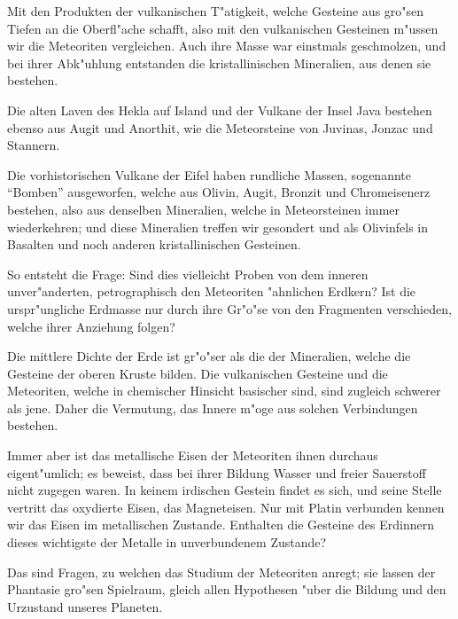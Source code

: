 \documentclass[a4paper, 11pt, oneside, german]{article}
\begin{document}
Mit den Produkten der vulkanischen T"atigkeit, welche Gesteine aus gro"sen Tiefen an die Oberfl"ache schafft, also mit den vulkanischen Gesteinen m"ussen wir die Meteoriten vergleichen. Auch ihre Masse war einstmals geschmolzen, und bei ihrer Abk"uhlung entstanden die kristallinischen Mineralien, aus denen sie bestehen.

Die alten Laven des Hekla auf Island und der Vulkane der Insel Java bestehen ebenso aus Augit und Anorthit, wie die Meteorsteine von Juvinas, Jonzac und Stannern.

Die vorhistorischen Vulkane der Eifel haben rundliche Massen, sogenannte "`Bomben"' ausgeworfen, welche aus Olivin, Augit, Bronzit und Chromeisenerz bestehen, also aus denselben Mineralien, welche in Meteorsteinen immer wiederkehren; und diese Mineralien treffen wir gesondert und als Olivinfels in Basalten und noch anderen kristallinischen Gesteinen.

So entsteht die Frage: Sind dies vielleicht Proben von dem inneren unver"anderten, petrographisch den Meteoriten "ahnlichen Erdkern? Ist die urspr"ungliche Erdmasse nur durch ihre Gr"o"se von den Fragmenten verschieden, welche ihrer Anziehung folgen?

Die mittlere Dichte der Erde ist gr"o"ser als die der Mineralien, welche die Gesteine der oberen Kruste bilden. Die vulkanischen Gesteine und die Meteoriten, welche in chemischer Hinsicht basischer sind, sind zugleich schwerer als jene. Daher die Vermutung, das Innere m"oge aus solchen Verbindungen bestehen.

Immer aber ist das metallische Eisen der Meteoriten ihnen durchaus eigent"umlich; es beweist, dass bei ihrer Bildung Wasser und freier Sauerstoff nicht zugegen waren. In keinem irdischen Gestein findet es sich, und seine Stelle vertritt das oxydierte Eisen, das Magneteisen. Nur mit Platin verbunden kennen wir das Eisen im metallischen Zustande. Enthalten die Gesteine des Erdinnern dieses wichtigste der Metalle in unverbundenem Zustande?

Das sind Fragen, zu welchen das Studium der Meteoriten anregt; sie lassen der Phantasie gro"sen Spielraum, gleich allen Hypothesen "uber die Bildung und den Urzustand unseres Planeten.
\clearpage
\end{document}
